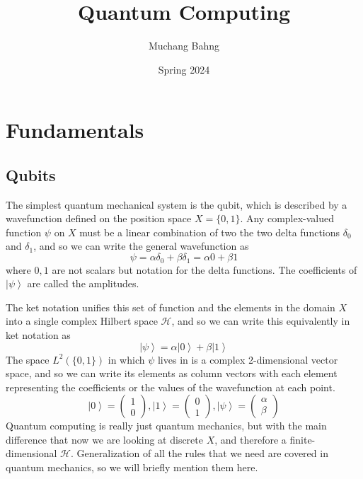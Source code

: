 \documentclass{article}
\newcommand{\ket}[1]{\ensuremath{\left|#1\right\rangle}}
\begin{document}
\title{Quantum Computing}
\author{Muchang Bahng}
\date{Spring 2024}

\maketitle
\tableofcontents
\pagebreak 

\section{Fundamentals}
  
  \subsection{Qubits}

    \begin{definition}[Qubit]
      The simplest quantum mechanical system is the qubit, which is described by a wavefunction defined on the position space $X = \{0, 1\}$. Any complex-valued function $\psi$ on $X$ must be a linear combination of two the two delta functions $\delta_0$ and $\delta_1$, and so we can write the general wavefunction as \begin{equation} 
        \psi = \alpha \delta_0 + \beta \delta_1 = \alpha 0 + \beta 1
      \end{equation} 
      where $0, 1$ are not scalars but notation for the delta functions. The coefficients of $\ket{\psi}$ are called the amplitudes. 
    \end{definition}

    The ket notation unifies this set of function and the elements in the domain $X$ into a single complex Hilbert space $\mathcal{H}$, and so we can write this equivalently in ket notation as 
    \begin{equation} 
      \ket{\psi} = \alpha \ket{0} + \beta \ket{1} 
    \end{equation}
    The space $L^2(\{0, 1\})$ in which $\psi$ lives in is a complex 2-dimensional vector space, and so we can write its elements as column vectors with each element representing the coefficients or the values of the wavefunction at each point. 
    \begin{equation} 
      \ket{0} = \begin{pmatrix} 1 \\ 0 \end{pmatrix}, \ket{1} = \begin{pmatrix} 0 \\ 1 \end{pmatrix}, \ket{\psi} = \begin{pmatrix} \alpha \\ \beta \end{pmatrix}
    \end{equation}
    Quantum computing is really just quantum mechanics, but with the main difference that now we are looking at discrete $X$, and therefore a finite-dimensional $\mathcal{H}$. Generalization of all the rules that we need are covered in quantum mechanics, so we will briefly mention them here. 
\end{document}

